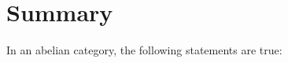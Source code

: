 

\section{Summary}
\setcounter{theorem}{0}
\setcounter{equation}{0}


\renewcommand{\theenumi}{\roman{enumi}}
\renewcommand{\labelenumi}{\textnormal{(\theenumi)}$\;\;$}


In an abelian category, the following statements are true:
